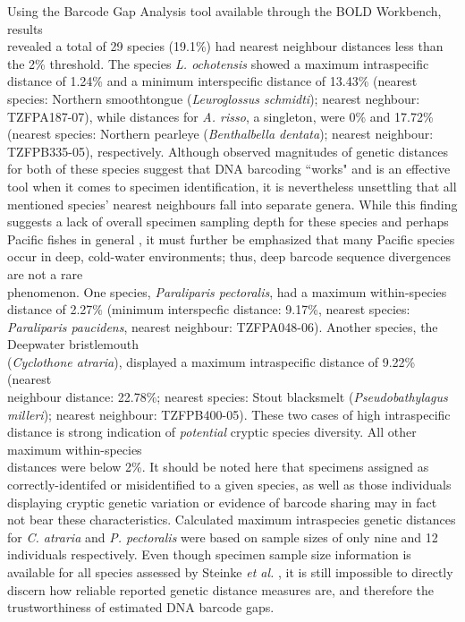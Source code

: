 Using the Barcode Gap Analysis tool available through the BOLD Workbench, results \\ revealed a total of 29 species (19.1\%) had nearest neighbour distances less than the 2\% threshold. The species \textit{L. ochotensis} showed a maximum intraspecific distance of 1.24\% and a minimum interspecific distance of 13.43\% (nearest species: Northern smoothtongue (\textit{Leuroglossus schmidti}); nearest neghbour: TZFPA187-07), while distances for \textit{A. risso}, a singleton, were 0\% and 17.72\% (nearest species: Northern pearleye (\textit{Benthalbella dentata}); nearest neighbour: TZFPB335-05), respectively. Although observed magnitudes of genetic distances for both of these species suggest that DNA barcoding ``works" and is an effective tool when it comes to specimen identification, it is nevertheless unsettling that all \\ mentioned species' nearest neighbours fall into separate genera. While this finding suggests a lack of overall specimen sampling depth for these species and perhaps Pacific fishes in general \cite{steinke2009dna}, it must further be emphasized that many Pacific species occur in deep, cold-water environments; thus, deep barcode sequence divergences are not a rare \\ phenomenon. One species, \textit{Paraliparis pectoralis}, had a maximum within-species distance of 2.27\% (minimum interspecfic distance: 9.17\%, nearest species: \textit{Paraliparis paucidens}, nearest neighbour: TZFPA048-06). Another species, the Deepwater bristlemouth \\ (\textit{Cyclothone atraria}), displayed a maximum intraspecific distance of 9.22\% (nearest \\ neighbour distance: 22.78\%; nearest species: Stout blacksmelt (\textit{Pseudobathylagus milleri}); nearest neighbour: TZFPB400-05). These two cases of high intraspecific distance is strong indication of \textit{potential} cryptic species diversity. All other maximum within-species \\ distances were below 2\%. It should be noted here that specimens assigned as \\ correctly-identifed or misidentified to a given species, as well as those individuals \\ displaying cryptic genetic variation or evidence of barcode sharing may in fact not bear these characteristics. Calculated maximum intraspecies genetic distances for \textit{C. atraria} and \textit{P. pectoralis} were based on sample sizes of only nine and 12 individuals respectively. Even though specimen sample size information is available for all species assessed by Steinke \textit{et al.} \cite{steinke2009dna}, it is still impossible to directly discern how reliable reported genetic distance measures are, and therefore the trustworthiness of estimated DNA barcode gaps.



